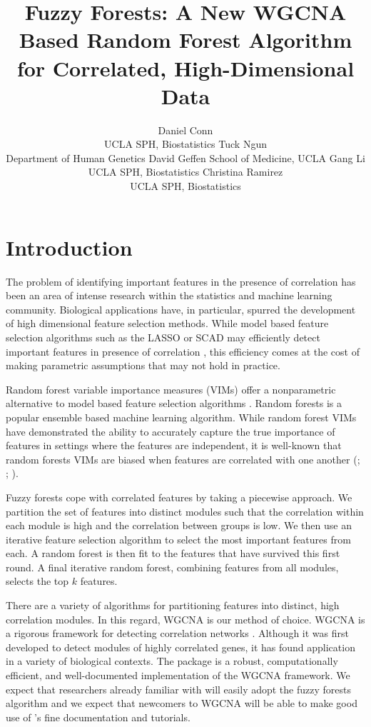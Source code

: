 \documentclass[article,shortnames]{jss}
\author{Daniel Conn\\UCLA SPH, Biostatistics \And Tuck Ngun\\Department of Human Genetics David Geffen School of Medicine, UCLA \And  Gang Li\\UCLA SPH, Biostatistics \And Christina Ramirez\\UCLA SPH, Biostatistics}
\title{Fuzzy Forests: A New WGCNA Based Random Forest Algorithm for Correlated, High-Dimensional Data}
\begin{document}

\section{Introduction}
The problem of identifying important features in the presence of correlation has been an area of intense research within the statistics
and machine learning community.  Biological applications have, in particular, spurred the development of high dimensional feature selection methods.   
While model based feature selection algorithms such as the LASSO or SCAD may efficiently detect important features in presence of correlation \citep{raskutti2010restricted}, this efficiency comes at the cost of making parametric assumptions that may not hold in practice. 
 
Random forest variable importance measures (VIMs) offer a nonparametric alternative to model based feature selection algorithms \citep{breiman2001random}.
Random forests is a popular ensemble based machine learning algorithm.  While random forest VIMs have demonstrated the ability to accurately capture the true 
importance of features in settings where the features are independent, it is well-known that random forests VIMs are biased when features are correlated
with one another (\citep{strobl2007bias}; \citep{strobl2008conditional}; \citep{nicodemus2009predictor}).

Fuzzy forests cope with correlated features by taking a piecewise approach.  We partition the set of features into distinct modules such that the correlation within each module is high and the correlation between groups is low.  We then use an iterative feature selection algorithm to select the most important
features from each.  A random forest is then fit to the features that have survived this first round.  A final iterative random forest,  combining features from all
modules, selects the top $k$ features. 

There are a variety of algorithms for partitioning features into distinct, high correlation modules.  In this regard, WGCNA is our method of choice.  WGCNA is a rigorous framework for detecting correlation networks \citep{zhang2005general}.  Although it was first developed to detect modules of highly correlated genes, it has found application in a variety of biological contexts.  The  package  is a robust, computationally efficient, and well-documented implementation of the WGCNA framework.  We expect that researchers already familiar with  will easily adopt the fuzzy forests algorithm and we expect that newcomers to WGCNA will be able to make good use of 's fine documentation and tutorials.
              
\end{document}
